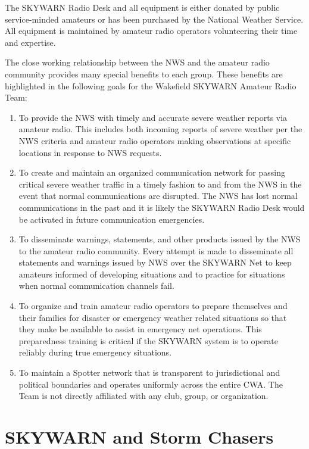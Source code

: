 \documentclass[pdflatex,letterpaper,twoside,12pt]{book}
\begin{document}
The SKYWARN Radio Desk and all equipment is either donated by public service-minded amateurs or has been purchased by the National Weather Service.  All equipment is maintained by amateur radio operators volunteering their time and expertise.

The close working relationship between the NWS and the amateur radio community provides many special benefits to each group. These benefits are highlighted in the following goals for the Wakefield SKYWARN Amateur Radio Team:

\begin{enumerate}
\item To provide the NWS with timely and accurate severe weather reports via amateur radio. This includes both incoming reports of severe weather per the NWS criteria and amateur radio operators making observations at specific locations in response to NWS requests.
\item To create and maintain an organized communication network for passing critical severe weather traffic in a timely fashion to and from the NWS in the event that normal communications are disrupted.  The NWS has lost normal communications in the past and it is likely the SKYWARN Radio Desk would be activated in future communication emergencies.
\item To disseminate warnings, statements, and other products issued by the NWS to the amateur radio community.  Every attempt is made to disseminate all statements and warnings issued by NWS over the SKYWARN Net to keep amateurs informed of developing situations and to practice for situations when normal communication channels fail.
\item To organize and train amateur radio operators to prepare themselves and their families for disaster or emergency weather related situations so that they make be available to assist in emergency net operations.  This preparedness training is critical if the SKYWARN system is to operate reliably during true emergency situations.
\item To maintain a Spotter network that is transparent to jurisdictional and political boundaries and operates uniformly across the entire CWA.  The Team is not directly affiliated with any club, group, or organization.
\end{enumerate}


\section{SKYWARN and Storm Chasers}
\end{document}
